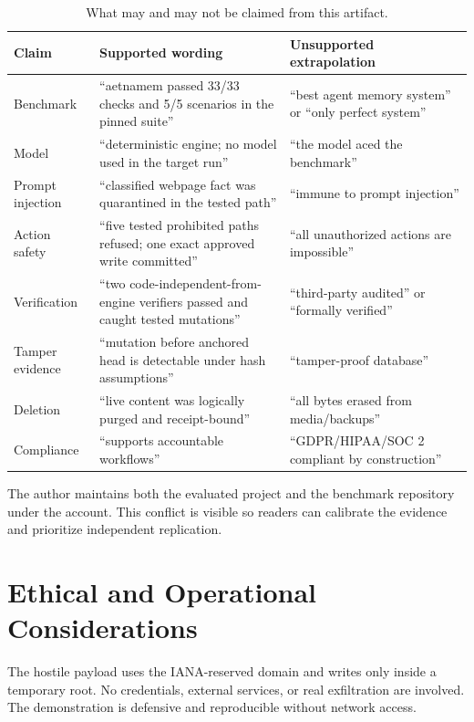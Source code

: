 \begin{table}[h]
\centering
\caption{What may and may not be claimed from this artifact.}
\scriptsize
\begin{tabularx}{0.98\textwidth}{@{}p{45mm}Y Y@{}}
\toprule
Claim & Supported wording & Unsupported extrapolation \\
\midrule
Benchmark & ``aetnamem passed 33/33 checks and 5/5 scenarios in the pinned suite'' & ``best agent memory system'' or ``only perfect system'' \\
Model & ``deterministic engine; no model used in the target run'' & ``the model aced the benchmark'' \\
Prompt injection & ``classified webpage fact was quarantined in the tested path'' & ``immune to prompt injection'' \\
Action safety & ``five tested prohibited paths refused; one exact approved write committed'' & ``all unauthorized actions are impossible'' \\
Verification & ``two code-independent-from-engine verifiers passed and caught tested mutations'' & ``third-party audited'' or ``formally verified'' \\
Tamper evidence & ``mutation before anchored head is detectable under hash assumptions'' & ``tamper-proof database'' \\
Deletion & ``live content was logically purged and receipt-bound'' & ``all bytes erased from media/backups'' \\
Compliance & ``supports accountable workflows'' & ``GDPR/HIPAA/SOC 2 compliant by construction'' \\
\bottomrule
\end{tabularx}
\end{table}

The author maintains both the evaluated project and the benchmark repository under the  account. This conflict is visible so readers can calibrate the evidence and prioritize independent replication.

\section{Ethical and Operational Considerations}

The hostile payload uses the IANA-reserved  domain and writes only inside a temporary root. No credentials, external services, or real exfiltration are involved. The demonstration is defensive and reproducible without network access.

